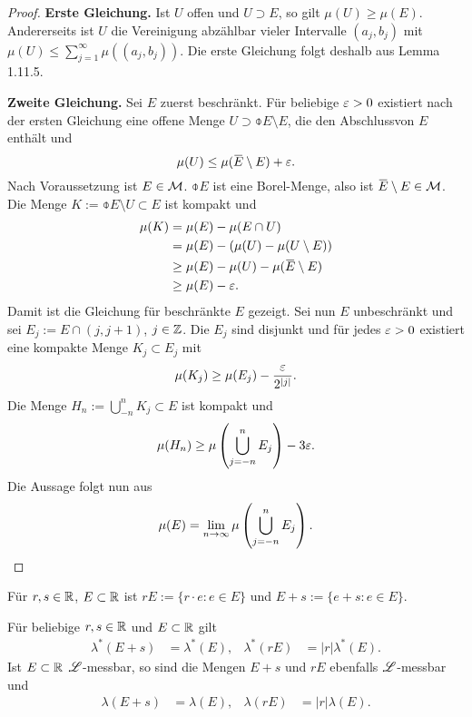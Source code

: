 \begin{proof}
 \textbf{Erste Gleichung.} Ist $U$ offen und $U \supset E$, so gilt $\mu(U) \ge \mu(E)$. Andererseits ist $U$ die Vereinigung abzählbar vieler Intervalle $(a_j,b_j)$ mit $\mu(U) \le \sum_{j=1}^\infty \mu((a_j, b_j))$. Die erste Gleichung folgt deshalb aus Lemma 1.11.5.
 
 \textbf{Zweite Gleichung.} Sei $E$ zuerst beschränkt. Für beliebige $\varepsilon > 0$ existiert nach der ersten Gleichung eine offene Menge $U \supset \obar{E} \setminus E$, die den Abschluss\footnotemark von $E$ enthält und
 \[ \mu(U) \le \mu( \obar{E} \setminus E ) + \eps. \]
 Nach Voraussetzung ist $E \in \mathcal{M}$. $\obar{E}$ ist eine Borel-Menge, also ist $\obar{E} \setminus E \in \meas$. Die Menge $K := \obar{E} \setminus U \subset E$ ist kompakt und
 \[ \begin{aligned}
     \mu(K) 
     &= \mu(E) - \mu(E \cap U) \\
     &= \mu(E) - ( \mu(U) - \mu(U \setminus E) ) \\
     &\ge \mu(E) - \mu(U) - \mu(\obar{E} \setminus E) \\
     &\ge \mu(E) - \eps.
    \end{aligned} \]
 Damit ist die Gleichung für beschränkte $E$ gezeigt. Sei nun $E$ unbeschränkt und sei $E_j := E \cap (j,j+1)$, $j \in \mathbb{Z}$. Die $E_j$ sind disjunkt und für jedes $\varepsilon > 0$ existiert eine kompakte Menge $K_j \subset E_j$ mit 
 \[ \mu(K_j) \ge \mu(E_j) - \frac{\varepsilon}{2^{|j|}}. \]
 Die Menge $H_n := \bigcup_{-n}^n K_j \subset E$ ist kompakt und
 \[ \mu( H_n ) \ge \mu \left( \bigcup_{j=-n}^n E_j \right) - 3 \varepsilon. \]
 Die Aussage folgt nun aus
 \[ \mu(E) = \lim_{n \to \infty} \mu \left( \bigcup_{j=-n}^n E_j \right). \qedhere\]
\end{proof}

Für $r,s \in \mathbb{R}$, $E \subset \mathbb{R}$ ist $rE := \{ r\cdot e : e \in E \}$ und $E+s:= \{ e+s : e \in E \}$.

\begin{thm}
 Für beliebige $r,s \in \mathbb{R}$ und $E \subset \mathbb{R}$ gilt
 \begin{align*}
  \lambda^* (E+s) &= \lambda^* (E), & \lambda^* (rE) &= |r| \lambda^* (E).
 \end{align*}
 Ist $E \subset \mathbb{R}$ $\mathscr{L}$-messbar, so sind die Mengen $E+s$ und $rE$ ebenfalls $\mathscr{L}$-messbar und
 \begin{align*}
  \lambda (E+s) &= \lambda (E), & \lambda(rE) &= |r| \lambda(E).
 \end{align*}
\end{thm}

